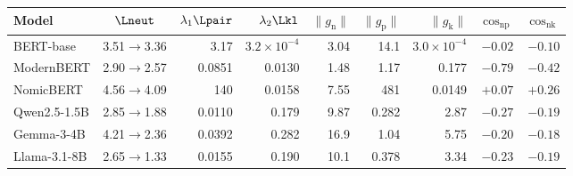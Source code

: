   \footnotesize\setlength{\tabcolsep}{3pt}
  \begin{tabular}{@{}lcrrrrrrr@{}}
    \toprule
    Model & $\Lneut$ & $\lambda_1\Lpair$ & $\lambda_2\Lkl$ & $\|g_{\mathrm{n}}\|$ & $\|g_{\mathrm{p}}\|$ & $\|g_{\mathrm{k}}\|$ & $\cos_{\mathrm{np}}$ & $\cos_{\mathrm{nk}}$ \\
    \midrule
    BERT-base & 3.51$\to$3.36 & 3.17 & $3.2{\times}10^{-4}$ & 3.04 & 14.1 & $3.0{\times}10^{-4}$ & $-0.02$ & $-0.10$ \\
    ModernBERT & 2.90$\to$2.57 & 0.0851 & 0.0130 & 1.48 & 1.17 & 0.177 & $-0.79$ & $-0.42$ \\
    NomicBERT & 4.56$\to$4.09 & 140 & 0.0158 & 7.55 & 481 & 0.0149 & $+0.07$ & $+0.26$ \\
    Qwen2.5-1.5B & 2.85$\to$1.88 & 0.0110 & 0.179 & 9.87 & 0.282 & 2.87 & $-0.27$ & $-0.19$ \\
    Gemma-3-4B & 4.21$\to$2.36 & 0.0392 & 0.282 & 16.9 & 1.04 & 5.75 & $-0.20$ & $-0.18$ \\
    Llama-3.1-8B & 2.65$\to$1.33 & 0.0155 & 0.190 & 10.1 & 0.378 & 3.34 & $-0.23$ & $-0.19$ \\
    \bottomrule
  \end{tabular}

